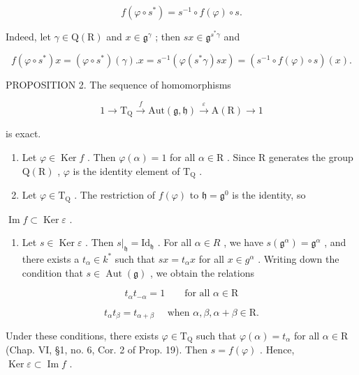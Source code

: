 \[
f (\varphi \circ s ^ {*}) = s ^ {- 1} \circ f (\varphi) \circ s.\tag{1}
\]

Indeed, let \(\gamma \in \mathrm{Q}(\mathrm{R})\) and \(x\in \mathfrak{g}^{\gamma}\) ; then \(sx\in \mathfrak{g}^{s^{*}\gamma}\) and

\[
f (\varphi \circ s ^ {*}) x = (\varphi \circ s ^ {*}) (\gamma). x = s ^ {- 1} (\varphi (s ^ {*} \gamma) s x) = (s ^ {- 1} \circ f (\varphi) \circ s) (x).
\]

PROPOSITION 2. The sequence of homomorphisms

\[
1 \longrightarrow \mathrm {T_ {Q}} \stackrel {f} {\longrightarrow} \mathrm{Aut} (\mathfrak {g}, \mathfrak {h}) \stackrel {\varepsilon} {\longrightarrow} \mathrm{A(R)} \longrightarrow 1
\]

is exact.

\begin{enumerate}
\def\labelenumi{\alph{enumi})}
\item
  Let \(\varphi \in \operatorname{Ker} f\) . Then \(\varphi(\alpha) = 1\) for all \(\alpha \in \mathrm{R}\) . Since \(\mathrm{R}\) generates the group \(\mathrm{Q}(\mathrm{R})\) , \(\varphi\) is the identity element of \(\mathrm{T}_{\mathrm{Q}}\) .
\item
  Let \(\varphi \in \mathrm{T}_{\mathrm{Q}}\) . The restriction of \(f(\varphi)\) to \(\mathfrak{h} = \mathfrak{g}^0\) is the identity, so
\end{enumerate}

\(\operatorname{Im} f \subset \operatorname{Ker} \varepsilon\) .

\begin{enumerate}
\def\labelenumi{\alph{enumi})}
\setcounter{enumi}{2}
\tightlist
\item
  Let \(s \in \operatorname{Ker} \varepsilon\) . Then \(s|_{\mathfrak{h}} = \mathrm{Id}_{\mathfrak{h}}\) . For all \(\alpha \in R\) , we have \(s(\mathfrak{g}^{\alpha}) = \mathfrak{g}^{\alpha}\) , and there exists a \(t_{\alpha} \in k^{*}\) such that \(sx = t_{\alpha}x\) for all \(x \in g^{\alpha}\) . Writing down the condition that \(s \in \operatorname{Aut}(\mathfrak{g})\) , we obtain the relations
\end{enumerate}

\[
t _ {\alpha} t _ {- \alpha} = 1 \qquad \text{for all } \alpha \in \mathrm{R}
\]

\[
t _ {\alpha} t _ {\beta} = t _ {\alpha + \beta} \quad \text { when } \alpha , \beta , \alpha + \beta \in \mathrm{R}.
\]

Under these conditions, there exists \(\varphi \in \mathrm{T}_{\mathrm{Q}}\) such that \(\varphi (\alpha) = t_{\alpha}\) for all \(\alpha \in \mathrm{R}\) (Chap. VI, §1, no. 6, Cor. 2 of Prop. 19). Then \(s = f(\varphi)\) . Hence, \(\operatorname{Ker} \varepsilon \subset \operatorname{Im} f\) .

